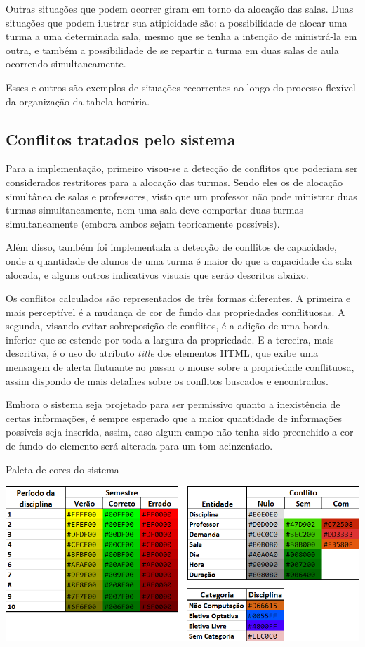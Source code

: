 Outras situações que podem ocorrer giram em torno da alocação das salas. Duas situações que podem ilustrar sua atipicidade são: a possibilidade de alocar uma turma a uma determinada sala, mesmo que se tenha a intenção de ministrá-la em outra, e também a possibilidade de se repartir a turma em duas salas de aula ocorrendo simultaneamente.

Esses e outros são exemplos de situações recorrentes ao longo do processo flexível da organização da tabela horária.

\subsection{Conflitos tratados pelo sistema}

Para a implementação, primeiro visou-se a detecção de conflitos que poderiam ser considerados restritores para a alocação das turmas. Sendo eles os de alocação simultânea de salas e professores, visto que um professor não pode ministrar duas turmas simultaneamente, nem uma sala deve comportar duas turmas simultaneamente (embora ambos sejam teoricamente possíveis).

Além disso, também foi implementada a detecção de conflitos de capacidade, onde a quantidade de alunos de uma turma é maior do que a capacidade da sala alocada, e alguns outros indicativos visuais que serão descritos abaixo.

Os conflitos calculados são representados de três formas diferentes. A primeira e mais perceptível é a mudança de cor de fundo das propriedades conflituosas. A segunda, visando evitar sobreposição de conflitos, é a adição de uma borda inferior que se estende por toda a largura da propriedade. E a terceira, mais descritiva, é o uso do atributo \textit{title} dos elementos HTML, que exibe uma mensagem de alerta flutuante ao passar o mouse sobre a propriedade conflituosa, assim dispondo de mais detalhes sobre os conflitos buscados e encontrados. %

Embora o sistema seja projetado para ser permissivo quanto a inexistência de certas informações, é sempre esperado que a maior quantidade de informações possíveis seja inserida, assim, caso algum campo não tenha sido preenchido a cor de fundo do elemento será alterada para um tom acinzentado.

\begin{MyCenteredFigure} \caption{Paleta de cores do sistema} \label{fig:conflitoDisciplinaPaleta}
  \includegraphics[width=\textwidth]{files/img/2.02!5-desenvolvimento/2.02!5.1.5-conflitos/Paleta de Cores}
\end{MyCenteredFigure}

